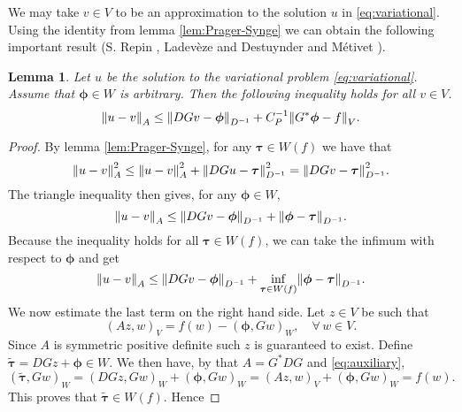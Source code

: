 \documentclass[ ]{elsarticle}
\newcommand{\mforall}{\forall\,}
\newcommand{\Grad}{G}
\newcommand{\Div}{G^*}
\newcommand{\vsp}{V}
\newcommand{\esp}{W}
\newcommand{\norm}[1]{\left\lVert#1\right\rVert}
\let\originalleft\left
\let\originalright\right
\renewcommand{\left}{\mathopen{}\mathclose\bgroup\originalleft}
\renewcommand{\right}{\aftergroup\egroup\originalright}
\newtheorem{lemma}[theorem]{Lemma}
\numberwithin{equation}{section}
\begin{document}
We may take $v\in\vsp$ to be an approximation to the solution $u$ in
\eqref{eq:variational}. Using the identity from lemma
\ref{lem:Prager-Synge} we can obtain the following important result
(S. Repin \cite{MR2458008}, Ladev{\`e}ze \cite{1975Ladeveze} and
Destuynder and M\'etivet \cite{1999DestuynderMetivet}).
\begin{lemma}\label{lem:Repin}
  Let $u$ be the solution to the variational problem
  \eqref{eq:variational}. Assume that $\bm\phi\in\esp$ is
  arbitrary. Then the following inequality holds for all $v\in\vsp$.
  \begin{equation}\label{eq:functional-estimate}
    \norm{u-v}_A \leq \norm{D\Grad  v-\bm\phi}_{D^{-1}} + C_P^{-1}\norm{\Grad ^*\bm\phi-f}_\vsp.
  \end{equation}
\end{lemma}
\begin{proof}
  By lemma \ref{lem:Prager-Synge}, for any $\bm\tau\in\esp(f)$ we have
  that
  \begin{equation*}
    \norm{u-v}^2_A\leq\norm{u-v}^2_A+\norm{D\Grad u-\bm\tau}^2_{D^{-1}}=\norm{D\Grad v-\bm\tau}^2_{D^{-1}}.
  \end{equation*}
  The triangle inequality then gives, for any $\bm\phi\in\esp$,
  \begin{equation*}
    \norm{u-v}_A\leq\norm{D\Grad v-\bm\phi}_{D^{-1}}+\norm{\bm\phi-\bm\tau}_{D^{-1}}.
  \end{equation*} 
  Because the inequality holds for all $\bm\tau\in\esp(f)$, we can take
  the infimum with respect to $\bm\phi$ and get
  \begin{equation*}
    \norm{u-v}_A\leq\norm{D\Grad v-\bm\phi}_{D^{-1}}+\inf_{\bm\tau\in\esp(f)}\norm{\bm\phi-\bm\tau}_{D^{-1}}.
  \end{equation*}
  We now estimate the last term on the right hand side. Let $z\in\vsp$
  be such that
  \begin{equation}\label{eq:auxiliary}
    (Az,w)_\vsp=f(w)-(\bm\phi,\Grad w)_\esp, \quad \mforall w\in \vsp.
  \end{equation}
  Since $A$ is symmetric positive definite such $z$ is guaranteed to
  exist. Define $\widetilde{\bm\tau}=D\Grad z+\bm\phi\in\esp$. We then
  have, by that $A=\Div D\Grad $ and \eqref{eq:auxiliary},
  \begin{equation*}
    (\widetilde{\bm\tau},\Grad w)_\esp = (D\Grad z,\Grad w)_\esp +
    (\bm\phi,\Grad w)_\esp = (Az,w)_\vsp + (\bm\phi,\Grad w)_\esp = f(w).
  \end{equation*} 
  This proves that $\widetilde{\bm\tau}\in\esp(f)$. Hence

\end{proof}
\end{document}
